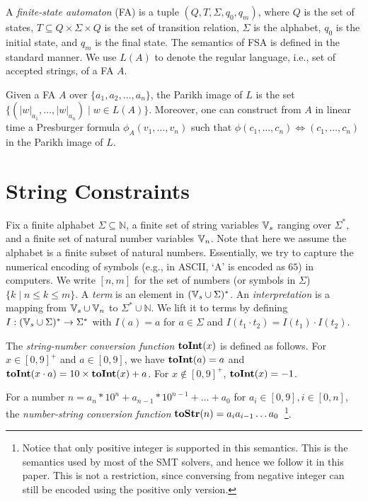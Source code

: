 \documentclass{llncs}
\begin{document}
A \emph{finite-state automaton} (FA) is a tuple $(Q,T,\Sigma,q_0,q_m)$, where $Q$ is the set of states, $T\subseteq Q\times \Sigma\times Q $ is the set of transition relation, $\Sigma$ is the alphabet, $q_0$ is the initial state, and $q_m$ is the final state. The semantics of FSA is defined in the standard manner. We use $L(A)$ to denote the regular language, i.e., set of accepted strings, of a FA $A$.

Given a FA $A$ over $\{a_1,a_2,\ldots,a_n\}$, the Parikh image of $L$ is the set $\{(|w|_{a_1},\ldots, |w|_{a_n}) \mid w \in  L(A) \}$. Moreover, one can construct from $A$ in linear time a Presburger formula $\phi_A(v_1, \ldots,v_n)$ such that $\phi(c_1, \ldots,c_n) \iff (c_1, \ldots,c_n)$ in the Parikh image of $L$.

\section{String Constraints} \label{section:sc}
Fix a finite alphabet $\Sigma \subseteq \mathbb{N}$, a finite set of string variables $\mbox{$\mathbb{V}_s$}$ ranging over $\Sigma^*$, and a finite set of natural number variables $\mbox{$\mathbb{V}_n$}$. Note that here we assume the alphabet is a finite subset of natural numbers. Essentially, we try to capture the numerical encoding of symbols (e.g., in ASCII, `A' is encoded as $65$) in computers. We write $[n,m]$ for the set of numbers (or symbols in $\Sigma$) $\{k\mid n\leq k \leq m\}$. A \emph{term} is an element in $(\mbox{$\mathbb{V}_s$}\cup \Sigma)^*$. An \emph{interpretation} is a mapping from $\mbox{$\mathbb{V}_s$}\cup \mbox{$\mathbb{V}_n$}$ to $\Sigma^* \cup \mathbb{N}$. We lift 
it to terms by defining $I: (\mbox{$\mathbb{V}_s$}\cup \Sigma)^* \rightarrow \Sigma^*$ with $I(a) =a$ for $a\in \Sigma$ and $I(t_1 \cdot t_2) = I(t_1)\cdot I(t_2)$. 

The \emph{string-number conversion function} $\mbox{\textbf{toInt}($x$)}$ is defined as follows. For $x\in [0,9]^+$ and $a\in [0,9]$, we have $\mbox{\textbf{toInt}($a$)}=a$ and $\mbox{\textbf{toInt}($x\cdot a$)} = 10\times \mbox{\textbf{toInt}($x$)}+a$. For $x\notin [0,9]^+$, $\mbox{\textbf{toInt}($x$)}=-1$. 

For a number $n=a_n*10^n+a_{n-1}*10^{n-1}+\ldots+a_0$ for $a_i\in [0,9], i\in [0,n]$, the \emph{number-string conversion function} $\mbox{\textbf{toStr}($n$)}=a_ia_{i-1}\ldots a_0$~\footnote{Notice that only positive integer is supported in this semantics. This is the semantics used by most of the SMT solvers, and hence we follow it in this paper. This is not a restriction, since conversing from negative integer can still be encoded using the positive only version.}.
\end{document}
